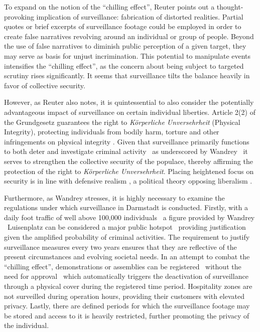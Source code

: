 \documentclass[12pt]{article}
\begin{document}
	To expand on the notion of the ``chilling effect'', Reuter points out a thought-provoking implication of surveillance: fabrication of distorted realities. Partial quotes or brief excerpts of surveillance footage could be employed in order to create false narratives revolving around an individual or group of people. Beyond the use of false narratives to diminish public perception of a given target, they may serve as basis for unjust incrimination. This potential to manipulate events intensifies the ``chilling effect'', as the concern about being subject to targeted scrutiny rises significantly. It seems that surveillance tilts the balance heavily in favor of collective security.
	
	However, as Reuter also notes, it is quintessential to also consider the potentially advantageous impact of surveillance on certain individual liberties. Article 2(2) of the Grundgesetz guarantees the right to \textit{Körperliche Unversehrheit} (Physical Integrity), protecting individuals from bodily harm, torture and other infringements on physical integrity \parencite{bildung_korperliche_nodate}. Given that surveillance primarily functions to both deter and investigate criminal activity \textemdash\ as underscored by Wandrey \textemdash\ it serves to strengthen the collective security of the populace, thereby affirming the protection of the right to \textit{Körperliche Unversehrheit}. Placing heightened focus on security is in line with defensive realism \parencite{courseCompanion2024}, a political theory opposing liberalism \parencite{jumarang2011}.  
	
	Furthermore, as Wandrey stresses, it is highly necessary to examine the regulations under which surveillance in Darmstadt is conducted. Firstly, with a daily foot traffic of well above 100,000 individuals \textemdash\ a figure provided by Wandrey \textemdash\ Luisenplatz can be considered a major public hotspot \textemdash\ providing justification given the amplified probability of criminal activities. The requirement to justify surveillance measures every two years ensures that they are reflective of the present circumstances and evolving societal needs. In an attempt to combat the ``chilling effect'', demonstrations or assemblies can be registered \textemdash\ without the need for approval \textemdash\ which automatically triggers the deactivation of surveillance through a physical cover during the registered time period. Hospitality zones are not surveilled during operation hours, providing their customers with elevated privacy. Lastly, there are defined periods for which the surveillance footage may be stored and access to it is heavily restricted, further promoting the privacy of the individual. 
	
\end{document}
